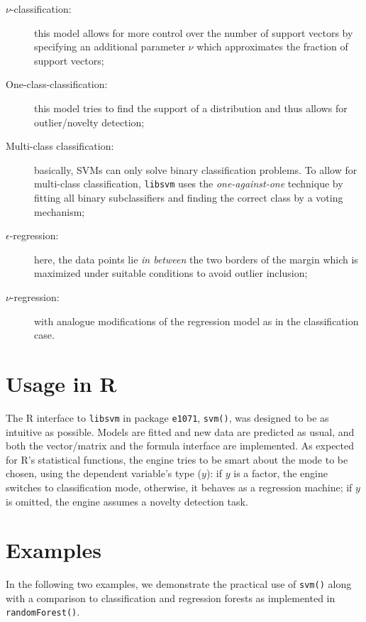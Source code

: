 \documentclass[a4paper]{article}
\newcommand{\pkg}[1]{\texttt{#1}}
\begin{document}
\begin{description}
 \item[$\nu$-classification:] this model allows for more control over
  the number of support vectors
  \cite[see][]{svm:scholkopf+smola+williamson:2000} by specifying an
  additional parameter $\nu$ which approximates the fraction of
  support vectors;
 \item[One-class-classification:] this model tries to find the support of a
  distribution and thus allows for outlier/novelty detection;
 \item[Multi-class classification:] basically, SVMs can only solve
  binary classification problems. To allow for multi-class
  classification, \texttt{libsvm} uses the
  \textit{one-against-one} technique by fitting all binary
  subclassifiers and finding the correct class by a voting mechanism;
 \item[$\epsilon$-regression:] here, the data points lie
  \textit{in between} the two borders of the margin which is maximized under
  suitable conditions to avoid outlier inclusion;
 \item[$\nu$-regression:] with analogue modifications of the regression
  model as in the classification case.
\end{description}

\section*{Usage in R}

The R interface to \texttt{libsvm} in package \pkg{e1071}, \texttt{svm()},
was designed to be as intuitive as possible. Models are fitted
and new data are predicted as usual, and both the vector/matrix and the
formula interface are implemented. As expected for R's statistical
functions, the engine tries to be smart about
the mode to be chosen, using the dependent variable's type ($y$):
if $y$ is a factor, the engine switches to
classification mode, otherwise, it behaves as a regression
machine; if $y$ is omitted, the engine assumes a novelty detection task.

\section*{Examples}

In the following two examples, we demonstrate the practical use of
\texttt{svm()} along with a comparison to classification and
regression forests as implemented in \texttt{randomForest()}.
\end{document}
